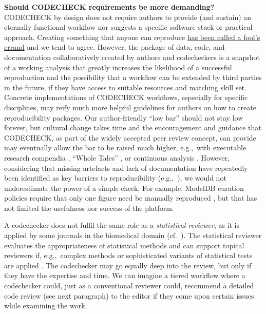 \documentclass[12pt]{article}
\begin{document}
\textbf{Should CODECHECK requirements be more demanding?}
CODECHECK by design does not require authors to provide (and sustain)
an eternally functional workflow nor suggests a specific software
stack or practical approach.
Creating something
that anyone can reproduce \href{https://twitter.com/DougBlank/status/1135904909663068165}{has been called a fool's
errand}
and we tend to agree.  However, the package of data, code, and
documentation collaboratively created by authors and codecheckers is a
snapshot of a working analysis that greatly increases the likelihood
of a successful reproduction and the possibility that a workflow can
be extended by third parties in the future, if they have
access to suitable resources and matching skill set.  Concrete
implementations of CODECHECK workflows, especially for specific
disciplines, may reify much more helpful guidelines for authors on how
to create reproducibility packages.  Our author-friendly ``low bar''
should not stay low forever, but cultural change takes time and the
encouragement and guidance that CODECHECK, as part of the widely
accepted peer review concept, can provide may eventually allow the bar
to be raised much higher, e.g.,~with executable research
compendia \cite{nust_opening_2017}, ``Whole Tales''
\cite{brinckman_computing_2018}, or continuous analysis
\cite{beaulieu-jones_reproducibility_2017-1}.  However, considering
that missing artefacts and lack of documentation have repeatedly been
identified as key barriers to reproducibility
(e.g.,~\cite{stagge_assessing_2019,nust_improving_2020}), we would not
underestimate the power of a simple check.  For example, ModelDB
curation policies require that only one figure need be manually reproduced
\cite{mcdougal_reproducibility_2016}, but that has not limited the
usefulness nor success of the platform.

A codechecker does not fulfil the same role as a \emph{statistical
  reviewer}, as it is applied by some journals in the biomedical
domain (cf.~\cite{petrovecki_role_2009,greenwood_how_2015}).  The
statistical reviewer evaluates the appropriateness of statistical
methods \cite{greenwood_how_2015} and can support topical reviewers
if, e.g.,~complex methods or sophisticated variants of statistical
tests are applied \cite{petrovecki_role_2009}.  The codechecker may go
equally deep into the review, but only if they have the expertise and
time. We can imagine a tiered workflow where a codechecker could, just
as a conventional reviewer could, recommend a detailed code review
(see next paragraph) to the editor if they come upon certain issues while
examining the work.
\end{document}
